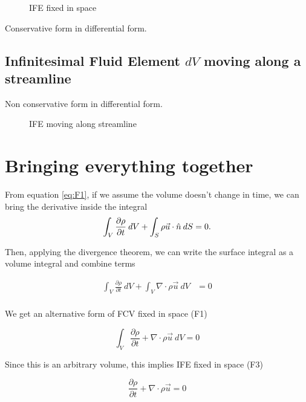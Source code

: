 \begin{figure}[ht]
    \centering
    \caption{IFE fixed in space}
    \label{fig:ife-fixed-in-space}
\end{figure}

Conservative form in differential form.

\subsection{Infinitesimal Fluid Element $dV$ moving along a streamline}%
Non conservative form in differential form.

\begin{figure}[ht]
    \centering
    \caption{IFE moving along streamline}
    \label{fig:ife-moving-along-streamline}
\end{figure}


\section{Bringing everything together}%

From equation \ref{eq:F1}, if we assume the volume doesn't change in time, 
we can bring the derivative inside the integral
\[
   \int_{V} { \frac{\partial\rho}{\partial t}} \: d{V} + \int_{S} { \rho \vec{u} \cdot \hat{n}} {}  \: {dS} {} = 0 \\
.\] 

Then, applying the divergence theorem, we can write the surface integral as
a volume integral and combine terms

\begin{align*}
  \int_{V} { \frac{\partial\rho}{\partial t}} \: d{V} + \int_{V} { \nabla\cdot\rho \vec{u}
  } \: {dV} &= 0 \\
\end{align*}

We get an alternative form of FCV fixed in space (F1)

\begin{equation}
  \boxed{\int_{V} { \frac{\partial\rho}{\partial t} +  \nabla\cdot\rho \vec{u}}
  \: d{V} = 0}
\end{equation}

Since this is an arbitrary volume, this implies IFE fixed in space (F3)

\begin{equation}
  \boxed{ \frac{\partial\rho}{\partial t} +  \nabla\cdot\rho \vec{u} = 0}
\end{equation}

